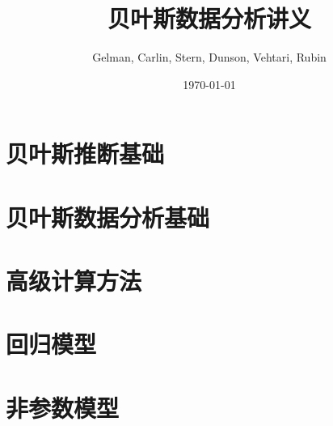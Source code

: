 \documentclass[12pt]{amsbook}
\title{贝叶斯数据分析讲义}
\author{Gelman, Carlin, Stern, Dunson, Vehtari, Rubin}
\date{\today}
\theoremstyle{definition}
\begin{document}

\maketitle
\tableofcontents



\part{贝叶斯推断基础}







\part{贝叶斯数据分析基础}






\part{高级计算方法}






\part{回归模型}







\part{非参数模型}







\appendix

\end{document}
